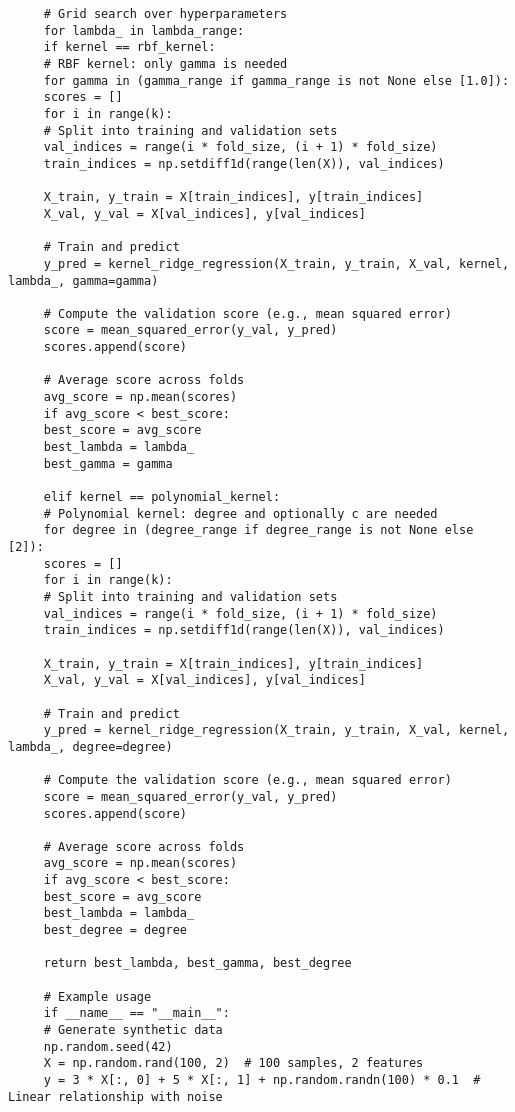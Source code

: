 \documentclass[letterpaper]{article}
\begin{document}
\begin{lstlisting}
     # Grid search over hyperparameters
     for lambda_ in lambda_range:
     if kernel == rbf_kernel:
     # RBF kernel: only gamma is needed
     for gamma in (gamma_range if gamma_range is not None else [1.0]):
     scores = []
     for i in range(k):
     # Split into training and validation sets
     val_indices = range(i * fold_size, (i + 1) * fold_size)
     train_indices = np.setdiff1d(range(len(X)), val_indices)
     
     X_train, y_train = X[train_indices], y[train_indices]
     X_val, y_val = X[val_indices], y[val_indices]
     
     # Train and predict
     y_pred = kernel_ridge_regression(X_train, y_train, X_val, kernel, lambda_, gamma=gamma)
     
     # Compute the validation score (e.g., mean squared error)
     score = mean_squared_error(y_val, y_pred)
     scores.append(score)
     
     # Average score across folds
     avg_score = np.mean(scores)
     if avg_score < best_score:
     best_score = avg_score
     best_lambda = lambda_
     best_gamma = gamma
     
     elif kernel == polynomial_kernel:
     # Polynomial kernel: degree and optionally c are needed
     for degree in (degree_range if degree_range is not None else [2]):
     scores = []
     for i in range(k):
     # Split into training and validation sets
     val_indices = range(i * fold_size, (i + 1) * fold_size)
     train_indices = np.setdiff1d(range(len(X)), val_indices)
     
     X_train, y_train = X[train_indices], y[train_indices]
     X_val, y_val = X[val_indices], y[val_indices]
     
     # Train and predict
     y_pred = kernel_ridge_regression(X_train, y_train, X_val, kernel, lambda_, degree=degree)
     
     # Compute the validation score (e.g., mean squared error)
     score = mean_squared_error(y_val, y_pred)
     scores.append(score)
     
     # Average score across folds
     avg_score = np.mean(scores)
     if avg_score < best_score:
     best_score = avg_score
     best_lambda = lambda_
     best_degree = degree
     
     return best_lambda, best_gamma, best_degree
     
     # Example usage
     if __name__ == "__main__":
     # Generate synthetic data
     np.random.seed(42)
     X = np.random.rand(100, 2)  # 100 samples, 2 features
     y = 3 * X[:, 0] + 5 * X[:, 1] + np.random.randn(100) * 0.1  # Linear relationship with noise
     

\end{lstlisting}
\end{document}
